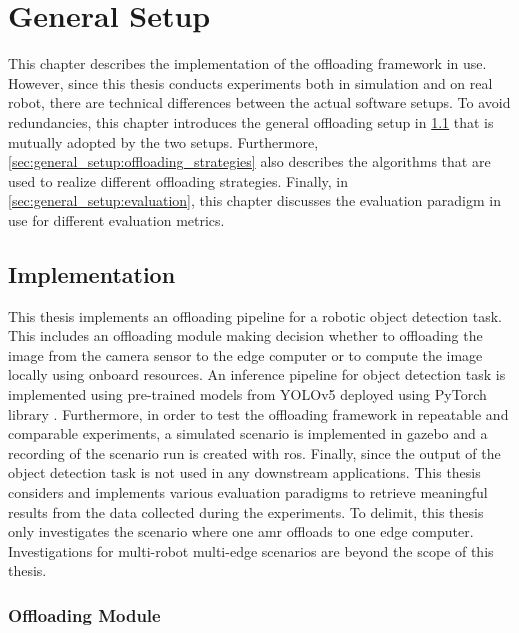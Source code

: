 \chapter{General Setup}\label{ch:general_setup}

This chapter describes the implementation of the offloading framework in use. However, since this thesis conducts experiments both in simulation and on real robot, there are technical differences between the actual software setups. To avoid redundancies, this chapter introduces the general offloading setup in \cref{sec:general_setup:implementation} that is mutually adopted by the two setups. Furthermore, \cref{sec:general_setup:offloading_strategies} also describes the algorithms that are used to realize different offloading strategies. 
Finally, in \cref{sec:general_setup:evaluation}, this chapter discusses the evaluation paradigm in use for different evaluation metrics.

\section{Implementation}\label{sec:general_setup:implementation}

This thesis implements an offloading pipeline for a robotic object detection task. This includes an offloading module making decision whether to offloading the image from the camera sensor to the edge computer or to compute the image locally using onboard resources. An inference pipeline for object detection task is implemented using pre-trained models from YOLOv5 \cite{Jocher2022} deployed using PyTorch library \cite{Paszke2019}. Furthermore, in order to test the offloading framework in repeatable and comparable experiments, a simulated scenario is implemented in \gls{gazebo} \cite{Koenig2004} and a recording of the scenario run is created with \gls{ros}. Finally, since the output of the object detection task is not used in any downstream applications. This thesis considers and implements various evaluation paradigms to retrieve meaningful results from the data collected during the experiments. To delimit, this thesis only investigates the scenario where one \gls{amr} offloads to one edge computer. Investigations for multi-robot multi-edge scenarios are beyond the scope of this thesis. 

\subsection{Offloading Module}

